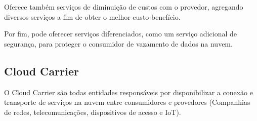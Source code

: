 	Oferece também serviços de diminuição de custos com o provedor, agregando diversos serviços a fim de obter o melhor custo-benefício.

	Por fim, pode oferecer serviços diferenciados, como um serviço adicional de segurança, para proteger o consumidor de vazamento de dados na nuvem.


	\subsection{Cloud Carrier}
	O Cloud Carrier são todas entidades responsáveis por disponibilizar a conexão e transporte de serviços na nuvem entre consumidores e provedores (Companhias de redes, telecomunicações, dispositivos de acesso e IoT). 